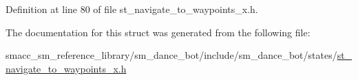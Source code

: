Definition at line 80 of file st\+\_\+navigate\+\_\+to\+\_\+waypoints\+\_\+x.\+h.



The documentation for this struct was generated from the following file\+:\begin{DoxyCompactItemize}
\item 
smacc\+\_\+sm\+\_\+reference\+\_\+library/sm\+\_\+dance\+\_\+bot/include/sm\+\_\+dance\+\_\+bot/states/\hyperlink{st__navigate__to__waypoints__x_8h}{st\+\_\+navigate\+\_\+to\+\_\+waypoints\+\_\+x.\+h}\end{DoxyCompactItemize}
